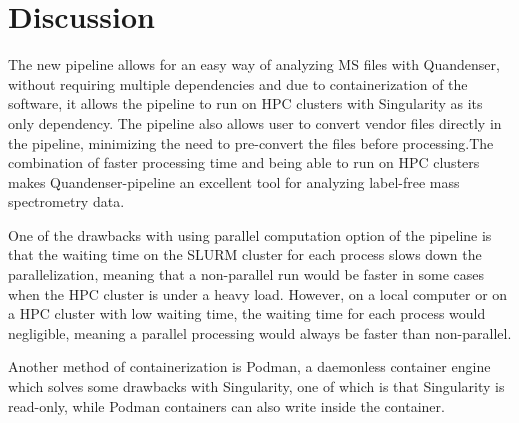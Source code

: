 \documentclass[11pt]{article}
\begin{document}
\section*{Discussion}

The new pipeline allows for an easy way of analyzing MS files with Quandenser, without requiring multiple dependencies and due to containerization of the software, it allows the pipeline to run on HPC clusters with Singularity as its only dependency. The pipeline also allows user to convert vendor files directly in the pipeline, minimizing the need to pre-convert the files before processing.The combination of faster processing time and being able to run on HPC clusters makes Quandenser-pipeline an excellent tool for analyzing label-free mass spectrometry data.

One of the drawbacks with using parallel computation option of the pipeline is that the waiting time on the SLURM cluster for each process slows down the parallelization, meaning that a non-parallel run would be faster in some cases when the HPC cluster is under a heavy load. However, on a local computer or on a HPC cluster with low waiting time, the waiting time for each process would negligible, meaning a parallel processing would always be faster than non-parallel.

Another method of containerization is Podman, a daemonless container engine which solves some drawbacks with Singularity, one of which is that Singularity is read-only, while Podman containers can also write inside the container.




\end{document}
